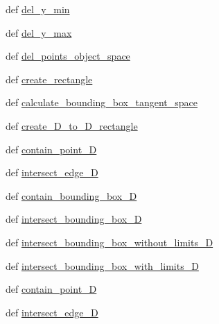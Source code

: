 \begin{DoxyCompactItemize}
def \hyperlink{classdestruction_1_1_bounding_box_1_1_bounding_box2_d_a8982e299ae34f56396f5ecc17f67789e}{del\-\_\-y\-\_\-min}
\item 
def \hyperlink{classdestruction_1_1_bounding_box_1_1_bounding_box2_d_a1b9646a5c8e1970d256a6804425ed980}{del\-\_\-y\-\_\-max}
\item 
def \hyperlink{classdestruction_1_1_bounding_box_1_1_bounding_box2_d_a4f53f5ee4b86cd91d69a30288c48e1a4}{del\-\_\-points\-\_\-object\-\_\-space}
\item 
def \hyperlink{classdestruction_1_1_bounding_box_1_1_bounding_box2_d_a0202cd07723aa704698b166064aa4c15}{create\-\_\-rectangle}
\item 
def \hyperlink{classdestruction_1_1_bounding_box_1_1_bounding_box2_d_a13cea23d55d76272febc8d998f65aa3e}{calculate\-\_\-bounding\-\_\-box\-\_\-tangent\-\_\-space}
\item 
def \hyperlink{classdestruction_1_1_bounding_box_1_1_bounding_box2_d_a618174b804295b78dc8d397d1e1dcf16}{create\-\_\-D\-\_\-to\-\_\-D\-\_\-rectangle}
\item 
def \hyperlink{classdestruction_1_1_bounding_box_1_1_bounding_box2_d_aa51bb5fd044c3b0959968313ba66382b}{contain\-\_\-point\-\_\-D}
\item 
def \hyperlink{classdestruction_1_1_bounding_box_1_1_bounding_box2_d_ac0ba01f458e250409693d23bbd1bfcf3}{intersect\-\_\-edge\-\_\-D}
\item 
def \hyperlink{classdestruction_1_1_bounding_box_1_1_bounding_box2_d_a6db51c7299d4ff4606b9048c440c45d0}{contain\-\_\-bounding\-\_\-box\-\_\-D}
\item 
def \hyperlink{classdestruction_1_1_bounding_box_1_1_bounding_box2_d_a5975436d58b7e6382b0d6ff4c23d600c}{intersect\-\_\-bounding\-\_\-box\-\_\-D}
\item 
def \hyperlink{classdestruction_1_1_bounding_box_1_1_bounding_box2_d_a5ddec91292e6ef8c421a3a3052c620f8}{intersect\-\_\-bounding\-\_\-box\-\_\-without\-\_\-limits\-\_\-D}
\item 
def \hyperlink{classdestruction_1_1_bounding_box_1_1_bounding_box2_d_a523a59e6416b751c6c491441887ef737}{intersect\-\_\-bounding\-\_\-box\-\_\-with\-\_\-limits\-\_\-D}
\item 
def \hyperlink{classdestruction_1_1_bounding_box_1_1_bounding_box2_d_a75b198e9823e84265bf138ba6f2dbfc6}{contain\-\_\-point\-\_\-D}
\item 
def \hyperlink{classdestruction_1_1_bounding_box_1_1_bounding_box2_d_ae7e3b4f57766bb042784987aa70b6b9b}{intersect\-\_\-edge\-\_\-D}

\end{DoxyCompactItemize}

